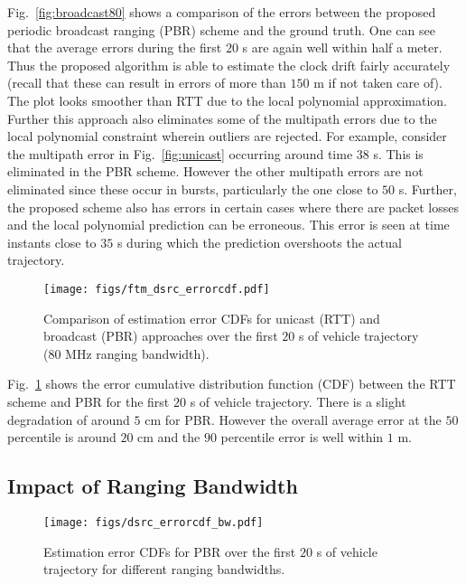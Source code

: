 \documentclass[12pt,journal,final,onecolumn]{IEEEtran}
\theoremstyle{definition}
\theoremstyle{myremark}
\begin{document}
Fig.~\ref{fig:broadcast80} shows a comparison of the errors between the proposed
periodic broadcast ranging (PBR) scheme and the ground truth. One can see that
the average errors during the first $20$ s are again well within half a meter.
Thus the proposed algorithm is able to estimate the clock drift fairly
accurately (recall that these can result in errors of more than $150$ m if not
taken care of). The plot looks smoother than RTT due to the local polynomial
approximation. Further this approach also eliminates some of the multipath
errors due to the local polynomial constraint wherein outliers are rejected. For
example, consider the multipath error in Fig.~\ref{fig:unicast} occurring around
time $38$ s. This is eliminated in the PBR scheme. However the other multipath
errors are not eliminated since these occur in bursts, particularly the one
close to $50$ s.  Further, the proposed scheme also has errors in certain cases
where there are packet losses and the local polynomial prediction can be
erroneous. This error is seen at time instants close to $35$ s during which the
prediction overshoots the actual trajectory.

\begin{figure}[htbp]
    \centering 
    \texttt{[image: figs/ftm\_dsrc\_errorcdf.pdf]} 

    \caption{Comparison of estimation error CDFs for unicast (RTT) and broadcast
        (PBR) approaches over the first $20$ s of vehicle trajectory ($80$ MHz ranging bandwidth).}
    \label{fig:cdf}
\end{figure}

Fig.~\ref{fig:cdf} shows the error cumulative distribution function (CDF)
between the RTT scheme and PBR for the first $20$ s of vehicle trajectory. There
is a slight degradation of around $5$ cm for PBR. However the overall average
error at the $50$ percentile is around $20$ cm and the $90$ percentile error is well
within $1$ m.


\subsection{Impact of Ranging Bandwidth}
\label{sec:experiments_bw}

\begin{figure}[htbp]
    \centering 
    \texttt{[image: figs/dsrc\_errorcdf\_bw.pdf]} 

    \caption{Estimation error CDFs for PBR over the first $20$ s of vehicle
    trajectory for different ranging bandwidths.}
    \label{fig:bandwidth}
\end{figure}
\end{document}
